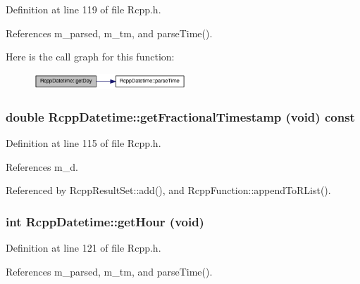 Definition at line 119 of file Rcpp.h.

References m\_\-parsed, m\_\-tm, and parseTime().

Here is the call graph for this function:\nopagebreak
\begin{figure}[H]
\begin{center}
\leavevmode
\includegraphics[width=162pt]{classRcppDatetime_a23e9f09bef162e1ffef0e43f8a446b77_cgraph}
\end{center}
\end{figure}
\hypertarget{classRcppDatetime_acb74d27387c0d851414e20d30354ac62}{
\subsubsection[{getFractionalTimestamp}]{\setlength{\rightskip}{0pt plus 5cm}double RcppDatetime::getFractionalTimestamp (void) const}}
\label{classRcppDatetime_acb74d27387c0d851414e20d30354ac62}


Definition at line 115 of file Rcpp.h.

References m\_\-d.

Referenced by RcppResultSet::add(), and RcppFunction::appendToRList().\hypertarget{classRcppDatetime_a0da8db1ecd235a6e7ab309e70e4e93b0}{
\subsubsection[{getHour}]{\setlength{\rightskip}{0pt plus 5cm}int RcppDatetime::getHour (void)}}
\label{classRcppDatetime_a0da8db1ecd235a6e7ab309e70e4e93b0}


Definition at line 121 of file Rcpp.h.

References m\_\-parsed, m\_\-tm, and parseTime().

